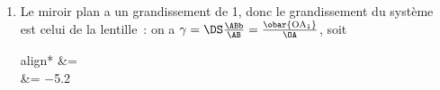 \documentclass[../../main/main.tex]{subfiles}
\begin{document}
{\begin{enumerate}
		      d'intersection entre le miroir plan et l'axe optique de la lentille.
		      L'image finale A' donnée par le miroir plan est telle que
		      \[
			      \boxed{\obar{\rm HA'} = \obar{\rm HA_1} = D}
		      \]
		      On a donc pour la lentille
		      \begin{empheq}[box=\fbox]{align*}
			       &=  + 
			      \\\Lra
			       &= d+D
		      \end{empheq}
		      On utilise la relation de conjugaison des lentilles minces en nommant
		      $V$ la vergence de la lentille~:
		      \begin{equation*}
			      V = \frac{1}{d+D} - \frac{1}{-h}
			      \Lra
			      \boxed{h = \frac{d+D}{V(d+D)-d}}
			      \qav
			      \left\{
			      \begin{array}{rcl}
				      d & = & \SI{10e-2}{m}    \\
				      D & = & \SI{3.0}{m}      \\
				      V & = & \SI{2.0}{m^{-1}}
			      \end{array}
			      \right.
		      \end{equation*}
		      Et l'application numérique donne
		      \begin{equation*}
			      \xul{h = \SI{60}{cm}}
		      \end{equation*}
		\item Le miroir plan a un grandissement de 1, donc le grandissement du
		      système est celui de la lentille~: on a $\gamma = \DS
			      \frac{\ABb}{\AB} = \frac{\obar{\rm OA_1}}{\OA}$, soit
		      \begin{empheq}[box=\fbox]{align*}
			      \gamma &= \\
			      \gamma &= \num{-5.2}
		      \end{empheq}
	\end{enumerate}
}
\end{document}
